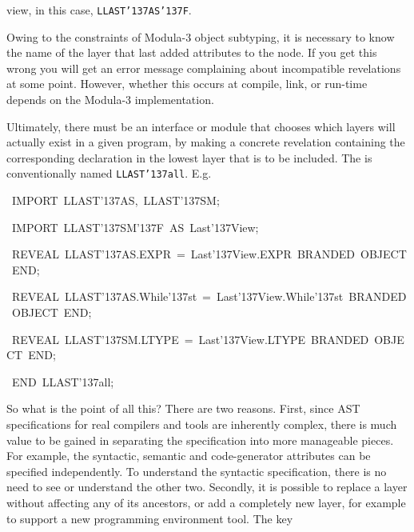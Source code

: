 {{view, in this case, {\tt LLAST\char'137{}AS\char'137{}F}.
\par
Owing to the constraints of Modula-3 object subtyping, it is necessary
to know the name of the layer that last added attributes to the node.
If you get this wrong you will get an error message complaining about
incompatible revelations at some point. However, whether this occurs
at compile, link, or run-time depends on the Modula-3 implementation.
\par
Ultimately, there must be an interface or module that chooses which layers
will actually exist in a given program, by making a concrete revelation
containing the corresponding declaration in the lowest layer that
is to be included. The is conventionally named {\tt LLAST\char'137{}all}. E.g.
\par
\par{}\noindent\par
{\display ~IMPORT~LLAST\char'137{}AS,~LLAST\char'137{}SM;}\noindent\par
{\display ~IMPORT~LLAST\char'137{}SM\char'137{}F~AS~Last\char'137{}View;}\noindent\par
\medskip\noindent%
\par{}\noindent\par
{\display ~REVEAL~LLAST\char'137{}AS.EXPR~=~Last\char'137{}View.EXPR~BRANDED~OBJECT~END;}\noindent\par
{\display ~REVEAL~LLAST\char'137{}AS.While\char'137{}st~=~Last\char'137{}View.While\char'137{}st~BRANDED~OBJECT~END;}\noindent\par
{\display ~REVEAL~LLAST\char'137{}SM.LTYPE~=~Last\char'137{}View.LTYPE~BRANDED~OBJECT~END;}\noindent\par
{\display ~END~LLAST\char'137{}all;}\noindent\par
\medskip\noindent%
So what is the point of all this? There are two reasons. First, since
AST specifications for real compilers and tools are inherently
complex, there is much value to be gained in separating the
specification into more manageable pieces. For example, the syntactic,
semantic and code-generator attributes can be specified independently.
To understand the syntactic specification, there is no need to see or
understand the other two. Secondly, it is possible to replace a layer
without affecting any of its ancestors, or add a completely new layer,
for example to support a new programming environment tool. The key
}}
